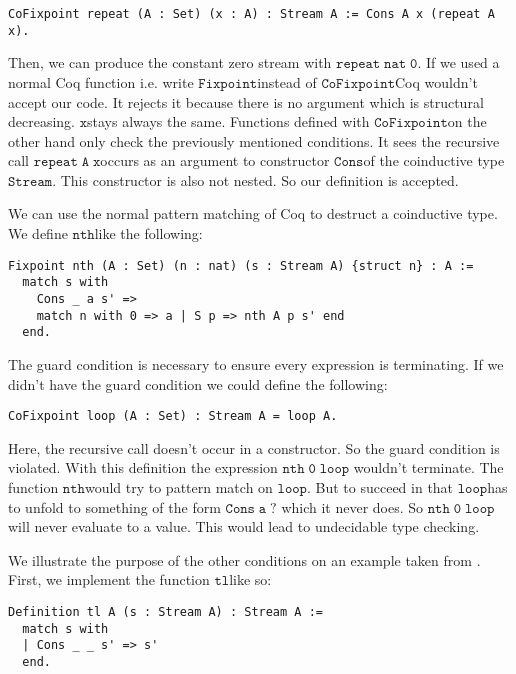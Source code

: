 \documentclass[a4paper,cleardoubleempty,BCOR1cm]{scrbook}
\begin{document}
\begin{verbatim}
CoFixpoint repeat (A : Set) (x : A) : Stream A := Cons A x (repeat A x).
\end{verbatim}

Then, we can produce the constant zero stream with $\mathtt{repeat\;nat\;0}$. If we used
a normal Coq function i.e. write $\mathtt{Fixpoint}$\;instead of $\mathtt{CoFixpoint}$\;Coq
wouldn't accept our code. It rejects it because there is no argument which is
structural decreasing. $\mathtt{x}$\;stays always the same. Functions defined with
$\mathtt{CoFixpoint}$\;on the other hand only check the previously mentioned
conditions. It sees the recursive call $\mathtt{repeat\;A\;x}$\;occurs as an argument to
constructor $\mathtt{Cons}$\;of the coinductive type $\mathtt{Stream}$. This constructor is also
not nested. So our definition is accepted.

We can use the normal pattern matching of Coq to destruct a coinductive type.
We define $\mathtt{nth}$\;like the following:

\begin{verbatim}
Fixpoint nth (A : Set) (n : nat) (s : Stream A) {struct n} : A :=
  match s with
    Cons _ a s' =>
    match n with 0 => a | S p => nth A p s' end
  end.
\end{verbatim}

The guard condition is necessary to ensure every expression is terminating.
If we didn't have the guard condition we could define the following:

\begin{verbatim}
CoFixpoint loop (A : Set) : Stream A = loop A.
\end{verbatim}

Here, the recursive call doesn't occur in a constructor. So the guard
condition is violated. With this definition the expression $\mathtt{nth\;0\;loop}$
wouldn't terminate. The function $\mathtt{nth}$\;would try to pattern match on $\mathtt{loop}$. But to
succeed in that $\mathtt{loop}$\;has to unfold to something of the form $\mathtt{Cons\;a\;?}$
which it never does. So $\mathtt{nth\;0\;loop}$\;will never evaluate to a value. This
would lead to undecidable type checking.

We illustrate the purpose of the other conditions on an example taken from
\cite{chlipala2013certified}.  First, we implement the function $\mathtt{tl}$\;like so:

\begin{verbatim}
Definition tl A (s : Stream A) : Stream A :=
  match s with
  | Cons _ _ s' => s'
  end.
\end{verbatim}
\end{document}
